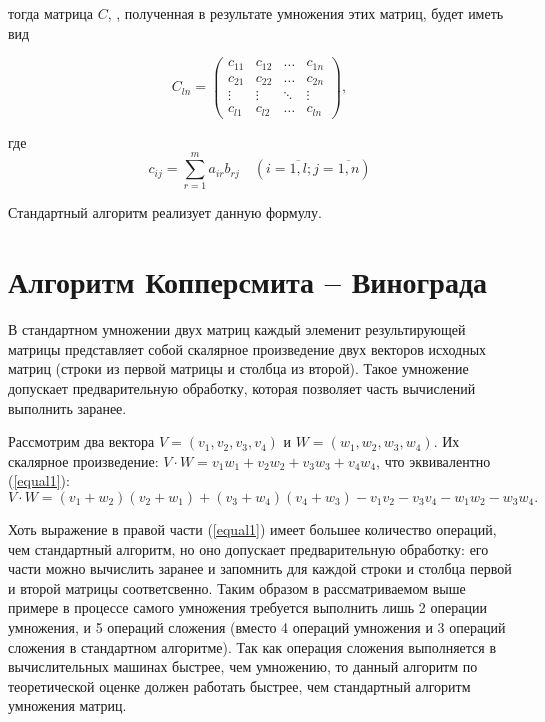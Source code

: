 \documentclass[12pt]{report}
\begin{document}
	тогда матрица $C$, , полученная в результате умножения этих матриц, будет иметь вид
	
	\begin{equation}
		C_{ln} = \begin{pmatrix}
			c_{11} & c_{12} & \ldots & c_{1n}\\
			c_{21} & c_{22} & \ldots & c_{2n}\\
			\vdots & \vdots & \ddots & \vdots\\
			c_{l1} & c_{l2} & \ldots & c_{ln}
		\end{pmatrix},
	\end{equation}

	где
	\begin{equation}
		\label{eq:M}
		c_{ij} =
			\sum_{r=1}^{m} a_{ir}b_{rj} \quad (i=\overline{1,l}; j=\overline{1,n})
	\end{equation}

	Стандартный алгоритм реализует данную формулу.
	
	
	\section{Алгоритм Копперсмита -- Винограда}
	
	В стандартном умножении двух матриц каждый элеменит результирующей матрицы представляет собой скалярное произведение двух векторов исходных матриц (строки из первой матрицы и столбца из второй). Такое умножение допускает предварительную обработку, которая позволяет часть вычислений выполнить заранее.
	
	Рассмотрим два вектора $V = (v_1, v_2, v_3, v_4)$ и $W = (w_1, w_2, w_3, w_4)$.
Их скалярное произведение: $V \cdot W = v_1w_1 + v_2w_2 + v_3w_3 + v_4w_4$, что эквивалентно (\ref{equal1}):
\begin{equation}
	\label{equal1}
		V \cdot W = (v_1 + w_2)(v_2 + w_1) + (v_3 + w_4)(v_4 + w_3) - v_1v_2 - v_3v_4 - w_1w_2 - w_3w_4.
\end{equation}

	Хоть выражение в правой части (\ref{equal1}) имеет большее количество операций, чем стандартный алгоритм, но оно допускает предварительную обработку: его части можно вычислить заранее и запомнить для каждой строки и столбца первой и второй матрицы соответсвенно. Таким образом в рассматриваемом выше примере в процессе самого умножения требуется выполнить лишь 2 операции умножения, и 5 операций сложения (вместо 4 операций умножения и 3 операций сложения в стандартном алгоритме). Так как операция сложения выполняется в вычислительных машинах быстрее, чем умножению, то данный алгоритм по теоретической оценке должен работать быстрее, чем стандартный алгоритм умножения матриц. 
	
\end{document}
